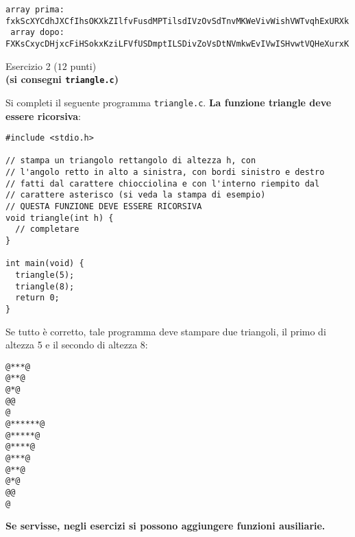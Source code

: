\documentclass[12pt]{article}
\begin{document}
\begin{mdframed}[backgroundcolor=lightgrey] 
\begin{verbatim}
array prima: fxkScXYCdhJXCfIhsOKXkZIlfvFusdMPTilsdIVzOvSdTnvMKWeVivWishVWTvqhExURXk
 array dopo: FXKsCxycDHjxcFiHSokxKziLFVfUSDmptILSDivZoVsDtNVmkwEvIVwISHvwtVQHeXurxK
\end{verbatim}
\end{mdframed}

\begin{center}
  {\Large Esercizio 2} ($12$ punti)\\
  \textbf{(si consegni \texttt{triangle.c})}
\end{center}
%
Si completi il seguente programma \texttt{triangle.c}.
\textbf{La funzione triangle deve essere ricorsiva}:

\begin{center}
  \begin{lstlisting}[language=myC]
#include <stdio.h>

// stampa un triangolo rettangolo di altezza h, con
// l'angolo retto in alto a sinistra, con bordi sinistro e destro
// fatti dal carattere chiocciolina e con l'interno riempito dal
// carattere asterisco (si veda la stampa di esempio)
// QUESTA FUNZIONE DEVE ESSERE RICORSIVA
void triangle(int h) {
  // completare
}

int main(void) {
  triangle(5);
  triangle(8);
  return 0;
}
  \end{lstlisting}
\end{center}

Se tutto \`e corretto, tale programma deve stampare due triangoli, il
primo di altezza 5 e il secondo di altezza 8:

\begin{mdframed}[backgroundcolor=lightgrey] 
\begin{verbatim}
@***@
@**@
@*@
@@
@
@******@
@*****@
@****@
@***@
@**@
@*@
@@
@
\end{verbatim}
\end{mdframed}

\begin{mdframed}[backgroundcolor=lightred] 
  \textbf{Se servisse, negli esercizi si possono aggiungere funzioni ausiliarie.}
\end{mdframed}
\end{document}
